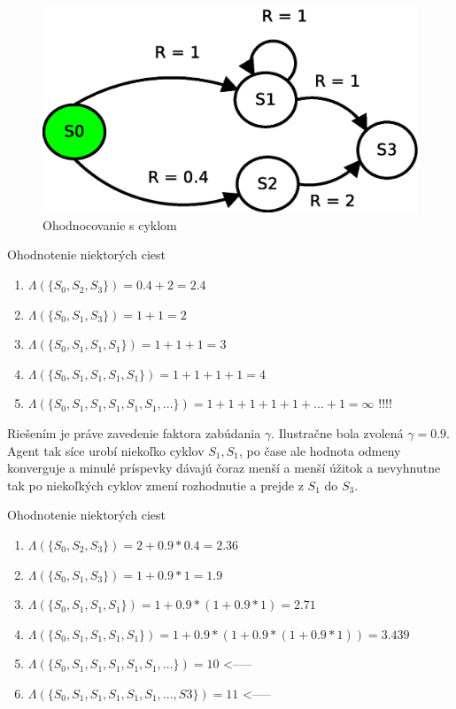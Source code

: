 \begin{figure}[!htb]
\centering
\includegraphics[scale=.6]{../diagrams/rf_cycle_states.eps}
\caption{Ohodnocovanie s cyklom}
\label{img:cycle_states_system}
\end{figure}

Ohodnotenie niektorých ciest
\begin{enumerate}
  \item $\Lambda(\{S_0, S_2, S_3\}) = 0.4+2 = 2.4$
  \item $\Lambda(\{S_0, S_1, S_3\}) = 1+1 = 2$
  \item $\Lambda(\{S_0, S_1, S_1, S_1\}) = 1+1+1 = 3$
  \item $\Lambda(\{S_0, S_1, S_1, S_1, S_1\}) = 1+1+1+1 = 4$
  \item $\Lambda(\{S_0, S_1, S_1, S_1, S_1, S_1, ...\}) = 1+1+1+1+1+...+1 = \infty$ !!!!
\end{enumerate}

Riešením je práve zavedenie faktora zabúdania $\gamma$. Ilustračne
bola zvolená $\gamma = 0.9$. Agent tak síce urobí niekoľko cyklov $S_1, S_1$,
po čase ale hodnota odmeny konverguje a minulé príspevky dávajú čoraz menší
a menší úžitok a nevyhnutne tak po niekoľkých cyklov zmení rozhodnutie a prejde
z $S_1$ do $S_3$.

Ohodnotenie niektorých ciest
\begin{enumerate}
  \item $\Lambda(\{S_0, S_2, S_3\}) = 2 + 0.9*0.4 = 2.36$
  \item $\Lambda(\{S_0, S_1, S_3\}) = 1 + 0.9*1 = 1.9$
  \item $\Lambda(\{S_0, S_1, S_1, S_1\}) = 1 + 0.9*(1 + 0.9*1) = 2.71 $
  \item $\Lambda(\{S_0, S_1, S_1, S_1, S_1\}) = 1 + 0.9*(1 + 0.9*(1 + 0.9*1)) = 3.439$
  \item $\Lambda(\{S_0, S_1, S_1, S_1, S_1, S_1, ...\}) = 10$ <-----
  \item $\Lambda(\{S_0, S_1, S_1, S_1, S_1, S_1, ..., S3\}) = 11$ <-----
\end{enumerate}

